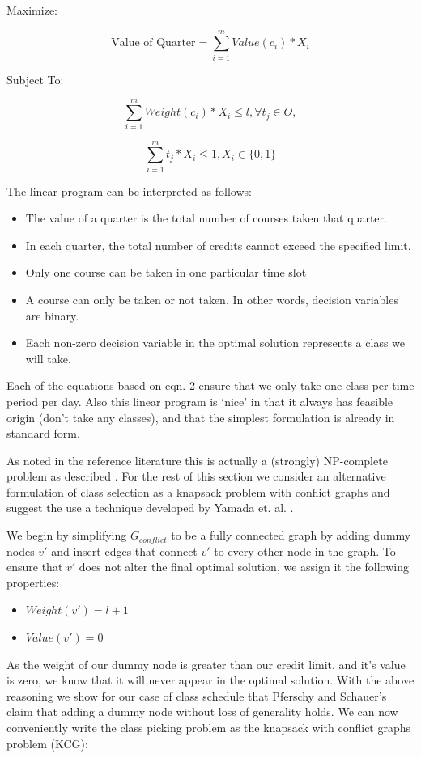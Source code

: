 \documentclass[11pt]{article} %
\begin{document}
Maximize: 

\begin{equation}
    \text{Value of Quarter} = \sum_{i=1}^m Value(c_i) * X_i
    \label{qtr_val}
\end{equation}

Subject To: 

\begin{equation}
    \sum_{i=1}^m Weight(c_i) * X_i \leq l, \forall t_j \in O,
    \label{weight_lim}
\end{equation}

\begin{equation}
    \sum_{i=1}^m t_j * X_i \leq 1, X_i \in \{0, 1\}
    \label{time_con}
\end{equation}

The linear program
can be interpreted as follows: \begin{itemize} \item The value of a quarter is
the total number of courses taken that quarter.  \item In each quarter, the
total number of credits cannot exceed the specified limit.  \item Only one
course can be taken in one particular time slot \item A course can only be taken
or not taken. In other words, decision variables are binary.  \item Each
non-zero decision variable in the optimal solution represents a class we will
take.  \end{itemize}

Each of the equations based on eqn. 2 ensure that we only take one class per 
time period per day. Also this linear program is ‘nice’ in that it always has 
feasible origin (don’t take any classes), and that the simplest formulation 
is already in standard form.

As noted in the reference literature this is actually a (strongly) NP-complete
problem as described \cite{pferschy:kcg}. For the rest of this section we
consider an alternative formulation of class selection as a knapsack problem
with conflict graphs and suggest the use a technique developed by Yamada et. al.
\cite{yamada:heuristic}.

We begin by simplifying $G_{conflict}$ to be a fully connected graph by adding
dummy nodes $v'$ and insert edges that connect $v'$ to every other node in the
graph. To ensure that $v'$ does not alter the final optimal solution, we assign
it the following properties: \begin{itemize} \item $Weight(v') = l+1$ \item
$Value(v') = 0$ \end{itemize} As the weight of our dummy node is greater than
our credit limit, and it's value is zero, we know that it will never appear in
the optimal solution. With the above reasoning we show for our case of class
schedule that Pferschy and Schauer's \cite{pferschy:kcg} claim that adding
a dummy node without loss of generality holds. We can now conveniently write the
class picking problem as the knapsack with conflict graphs problem (KCG): 
\end{document}
